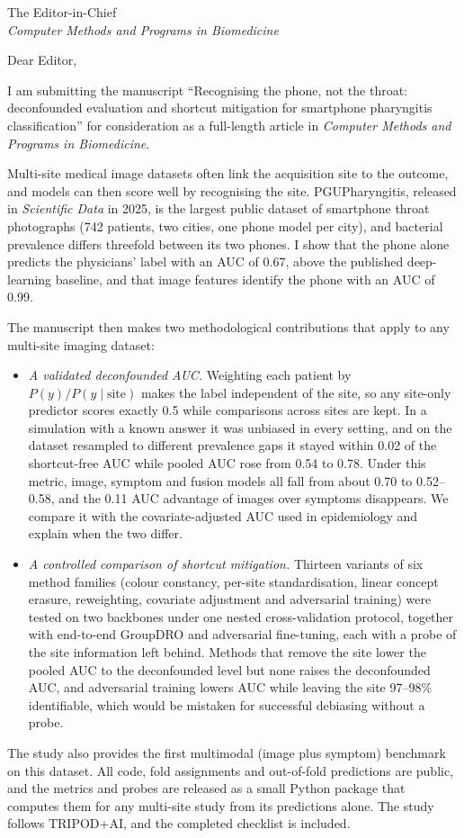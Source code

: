 \documentclass[11pt]{letter}
\begin{document}
\begin{letter}{The Editor-in-Chief\\
\textit{Computer Methods and Programs in Biomedicine}}
\opening{Dear Editor,}

I am submitting the manuscript ``Recognising the phone, not the throat: deconfounded evaluation and shortcut mitigation for smartphone pharyngitis classification'' for consideration as a full-length article in \textit{Computer Methods and Programs in Biomedicine}.

Multi-site medical image datasets often link the acquisition site to the outcome, and models can then score well by recognising the site. PGUPharyngitis, released in \textit{Scientific Data} in 2025, is the largest public dataset of smartphone throat photographs (742 patients, two cities, one phone model per city), and bacterial prevalence differs threefold between its two phones. I show that the phone alone predicts the physicians' label with an AUC of 0.67, above the published deep-learning baseline, and that image features identify the phone with an AUC of 0.99.

The manuscript then makes two methodological contributions that apply to any multi-site imaging dataset:
\begin{itemize}
\item \textit{A validated deconfounded AUC.} Weighting each patient by $P(y)/P(y \mid \text{site})$ makes the label independent of the site, so any site-only predictor scores exactly 0.5 while comparisons across sites are kept. In a simulation with a known answer it was unbiased in every setting, and on the dataset resampled to different prevalence gaps it stayed within 0.02 of the shortcut-free AUC while pooled AUC rose from 0.54 to 0.78. Under this metric, image, symptom and fusion models all fall from about 0.70 to 0.52--0.58, and the 0.11 AUC advantage of images over symptoms disappears. We compare it with the covariate-adjusted AUC used in epidemiology and explain when the two differ.
\item \textit{A controlled comparison of shortcut mitigation.} Thirteen variants of six method families (colour constancy, per-site standardisation, linear concept erasure, reweighting, covariate adjustment and adversarial training) were tested on two backbones under one nested cross-validation protocol, together with end-to-end GroupDRO and adversarial fine-tuning, each with a probe of the site information left behind. Methods that remove the site lower the pooled AUC to the deconfounded level but none raises the deconfounded AUC, and adversarial training lowers AUC while leaving the site 97--98\% identifiable, which would be mistaken for successful debiasing without a probe.
\end{itemize}
The study also provides the first multimodal (image plus symptom) benchmark on this dataset. All code, fold assignments and out-of-fold predictions are public, and the metrics and probes are released as a small Python package that computes them for any multi-site study from its predictions alone. The study follows TRIPOD+AI, and the completed checklist is included.


\end{letter}
\end{document}
